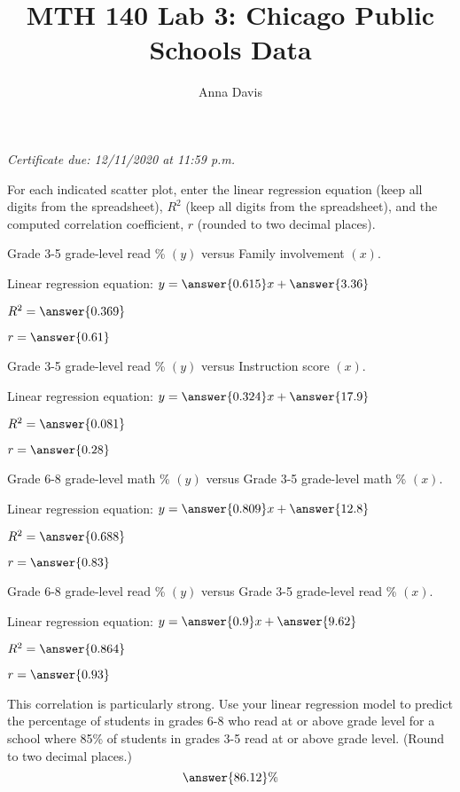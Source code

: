 \documentclass{ximera}
\author{Anna Davis} \title{MTH 140 Lab 3: Chicago Public Schools Data}
\begin{document}
\begin{abstract}

\end{abstract}
\maketitle
 \textit{Certificate due: 12/11/2020 at 11:59 p.m.}
 
For each indicated scatter plot, enter the linear regression equation (keep all digits from the spreadsheet), $R^2$ (keep all digits from the spreadsheet), and the computed correlation coefficient, $r$ (rounded to two decimal places).

\begin{problem}\label{prob:140lab4prob1}
Grade 3-5 grade-level read \% $(y)$ versus Family involvement $(x)$.

Linear regression equation: $y=\answer{0.615}x+\answer{3.36}$

$R^2=\answer{0.369}$

$r=\answer{0.61}$
\end{problem}

\begin{problem}\label{prob:140lab4prob2}
Grade 3-5 grade-level read \% $(y)$ versus Instruction score $(x)$.

Linear regression equation: $y=\answer{0.324}x+\answer{17.9}$

$R^2=\answer{0.081}$

$r=\answer{0.28}$
\end{problem}

\begin{problem}\label{prob:140lab4prob3}
Grade 6-8 grade-level math \% $(y)$ versus Grade 3-5 grade-level math \% $(x)$.

Linear regression equation: $y=\answer{0.809}x+\answer{12.8}$

$R^2=\answer{0.688}$

$r=\answer{0.83}$
\end{problem}

\begin{problem}\label{prob:140lab4prob4}
Grade 6-8 grade-level read \% $(y)$ versus Grade 3-5 grade-level read \% $(x)$.

Linear regression equation: $y=\answer{0.9}x+\answer{9.62}$

$R^2=\answer{0.864}$

$r=\answer{0.93}$

This correlation is particularly strong.  Use your linear regression model to predict the percentage of students in grades 6-8 who read at or above grade level for a school where 85\% of students in grades 3-5 read at or above grade level.  (Round to two decimal places.)
$$\answer{86.12}\%$$
\end{problem}
\end{document}
